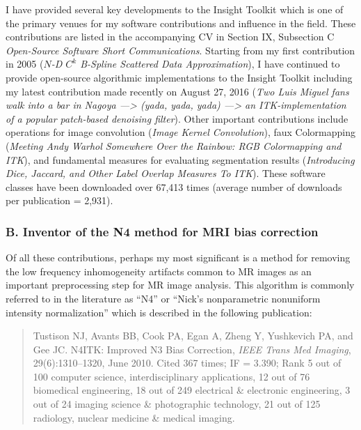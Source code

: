 \documentclass[11pt,]{article}
\begin{document}
I have provided several key developments to the Insight Toolkit which is
one of the primary venues for my software contributions and influence in
the field. These contributions are listed in the accompanying CV in
Section IX, Subsection C \emph{Open-Source Software Short
Communications}. Starting from my first contribution in 2005
(\emph{\(N\)-D \(C^k\) B-Spline Scattered Data Approximation}), I have
continued to provide open-source algorithmic implementations to the
Insight Toolkit including my latest contribution made recently on August
27, 2016 (\emph{Two Luis Miguel fans walk into a bar in Nagoya
---\textgreater{} (yada, yada, yada) ---\textgreater{} an
ITK-implementation of a popular patch-based denoising filter}). Other
important contributions include operations for image convolution
(\emph{Image Kernel Convolution}), faux Colormapping (\emph{Meeting Andy
Warhol Somewhere Over the Rainbow: RGB Colormapping and ITK}), and
fundamental measures for evaluating segmentation results
(\emph{Introducing Dice, Jaccard, and Other Label Overlap Measures To
ITK}). These software classes have been downloaded over 67,413 times
(average number of downloads per publication = 2,931).

\subsubsection{B. Inventor of the N4 method for MRI bias
correction}\label{b.-inventor-of-the-n4-method-for-mri-bias-correction}

Of all these contributions, perhaps my most significant is a method for
removing the low frequency inhomogeneity artifacts common to MR images
as an important preprocessing step for MR image analysis. This algorithm
is commonly referred to in the literature as ``N4'' or ``Nick's
nonparametric nonuniform intensity normalization'' which is described in
the following publication:

\begin{quote}
Tustison NJ, Avants BB, Cook PA, Egan A, Zheng Y, Yushkevich PA, and Gee
JC. N4ITK: Improved N3 Bias Correction, \emph{IEEE Trans Med Imaging},
29(6):1310--1320, June 2010. Cited 367 times; IF = 3.390; Rank 5 out of
100 computer science, interdisciplinary applications, 12 out of 76
biomedical engineering, 18 out of 249 electrical \& electronic
engineering, 3 out of 24 imaging science \& photographic technology, 21
out of 125 radiology, nuclear medicine \& medical imaging.
\end{quote}
\end{document}
